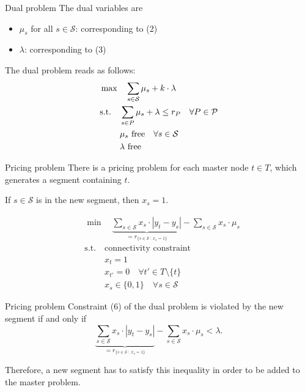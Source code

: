 \documentclass[fleqn]{beamer}
\newcommand{\superpixels}{\mathcal{S}}
\begin{document}
	\begin{frame}{Dual problem}
		The dual variables are
		\begin{itemize}
			\item $\mu_s$ for all $s\in\superpixels$: corresponding to (2)
			\item $\lambda$: corresponding to (3)
		\end{itemize}
		
		The dual problem reads as follows:
		\begin{align}
		    &\max\quad \smashoperator{\sum_{s\in\superpixels}} \mu_s + k\cdot\lambda \\
		    &\text{s.t.}\quad \sum_{s\in P} \mu_s + \lambda \leq r_P \quad\forall P\in\mathcal{P} \\
		    &\phantom{\text{s.t.}\quad} \mu_s \text{ free} \quad\forall s\in\superpixels \\
		    &\phantom{\text{s.t.}\quad} \lambda \text{ free}
		\end{align}
	\end{frame}
	
	\begin{frame}{Pricing problem}
		There is a pricing problem for each master node $t\in T$,
		which generates a segment containing $t$.
		
		If $s\in\superpixels$ is in the new segment, then $x_s=1$.		
		 
		\begin{align}
    		&\min\quad \underbrace{\sum_{s\in\superpixels} x_s\cdot|y_t-y_s|}_{=r_{\{s\in\superpixels\ :\ x_s=1\}}} - \sum_{s\in\superpixels} x_s\cdot\mu_s \\
    		&\text{s.t.}\quad \text{connectivity constraint} \\
            &\phantom{\text{s.t.}\quad} x_t = 1 \\
            &\phantom{\text{s.t.}\quad} x_{t'} = 0 \quad\forall t'\in T\setminus\{t\} \\
	    	&\phantom{\text{s.t.}\quad} x_s \in\{0,1\} \quad\forall s\in\superpixels
		\end{align}
	\end{frame}
	
	\begin{frame}{Pricing problem}
		Constraint (6) of the dual problem is violated by the new segment if and only if
		\[\underbrace{\sum_{s\in\superpixels} x_s\cdot|y_t-y_s|}_{=r_{\{s\in\superpixels\ :\ x_s=1\}}} - \sum_{s\in\superpixels} x_s\cdot\mu_s < \lambda.\]
        
		Therefore, a new segment has to satisfy this inequality in order to be added to the master problem.
	\end{frame}
    
\end{document}
